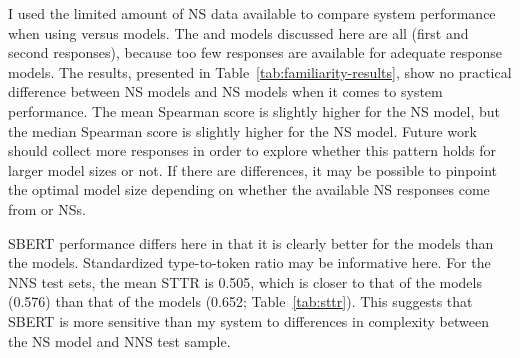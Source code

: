 I used the limited amount of  NS data available to compare system performance when using  versus  models. The  and  models discussed here are all  (first and second responses), because too few  responses are available for adequate  response models. The results, presented in Table~\ref{tab:familiarity-results}, show no practical difference between  NS models and  NS models when it comes to system performance. The mean Spearman score is slightly higher for the  NS model, but the median Spearman score is slightly higher for the  NS model. Future work should collect more  responses in order to explore whether this pattern holds for larger model sizes or not. If there are differences, it may be possible to pinpoint the optimal model size depending on whether the available NS responses come from  or  NSs.

SBERT performance differs here in that it is clearly better for the  models than the  models. Standardized type-to-token ratio may be informative here. For the NNS test sets, the mean STTR is 0.505, which is closer to that of the  models (0.576) than that of the  models (0.652; Table~\ref{tab:sttr}). This suggests that SBERT is more sensitive than my system to differences in complexity between the NS model and NNS test sample.



%
%


